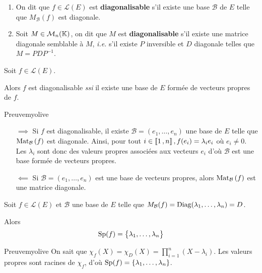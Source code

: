     \begin{defi}{}{}
        \begin{enumerate}[label= \textcolor{myyellow}{\arabic*.}]
            \item On dit que $f \in \mathcal{L}(E)$ est \textbf{diagonalisable} s’il existe une base $\mathcal{B}$ de $E$ telle que $M_{\mathcal{B}}(f)$ est diagonale.
            \item Soit $M \in \mathcal{M}_{n}(\mathbb{K})$, on dit que $M$ est \textbf{diagonalisable} s’il existe une matrice diagonale semblable à $M$, \textit{i.e.} s’il existe $P$ inversible et $D$ diagonale telles que $M = P D P^{-1}$.
        \end{enumerate}
    \end{defi}

    \begin{prop}{}{}
        Soit $f \in \mathcal{L}(E)$.

        Alors $f$ est diagonalisable \textit{ssi} il existe une base de $E$ formée de vecteurs propres de $f$.
    \end{prop}

    \begin{demo}{Preuve}{myolive}
        \begin{itemize}
            \item[$\implies$] Si $f$ est diagonalisable, il existe $\mathcal{B} = (e_1,\ldots,e_n)$ une base de $E$ telle que $\text{Mat}_{\mathcal{B}}\left(f\right)$ est diagonale. Ainsi, pour tout $i \in \left\llbracket 1 \, , n \right\rrbracket, f(e_i) = \lambda_i e_i$ où $e_i \neq 0$. Les $\lambda_i$ sont donc des valeurs propres associées aux vecteurs $e_i$ d’où $\mathcal{B}$ est une base formée de vecteurs propres.
            \item[$\impliedby$] Si $\mathcal{B} = (e_1,\ldots,e_n)$ est une base de vecteurs propres, alors $\text{Mat}_{\mathcal{B}}\left(f\right)$ est une matrice diagonale.
        \end{itemize}
    \end{demo}

    \begin{prop}{}{}
        Soit $f \in \mathcal{L}(E)$ et $\mathcal{B}$ une base de $E$ telle que $M_{\mathcal{B}}(f) = \operatorname{Diag}(\lambda_1, \ldots, \lambda_n) = D$.

        Alors \[ \operatorname{Sp}(f) = \big\{ \lambda_1,\ldots,\lambda_n \big\} \]
    \end{prop}

    \begin{demo}{Preuve}{myolive}
        On sait que $\chi_f(X) = \chi_D(X) = \prod_{i = 1}^n (X - \lambda_i)$. Les valeurs propres sont racines de $\chi_f$, d’où $\operatorname{Sp}(f) = \left\{\lambda_1, \ldots, \lambda_n\right\}$.
    \end{demo}

